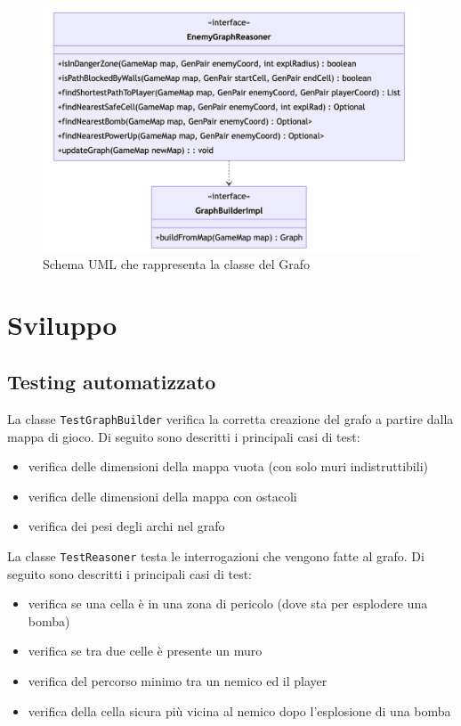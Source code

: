 \documentclass[a4paper,12pt]{report}
\begin{document}
\begin{figure}[h]
\centering{}
\includegraphics[width=\textwidth]{report-src/img/enemyGraph.png}
\caption{Schema UML che rappresenta la classe del Grafo}
\end{figure}

\chapter{Sviluppo}
\section{Testing automatizzato}

\par
La classe \texttt{TestGraphBuilder} verifica la corretta creazione del grafo a partire dalla mappa di gioco. Di seguito sono descritti i principali casi di test:
\begin{itemize}
    \item verifica delle dimensioni della mappa vuota (con solo muri indistruttibili)
    \item verifica delle dimensioni della mappa con ostacoli
    \item verifica dei pesi degli archi nel grafo
\end{itemize}

\par
La classe \texttt{TestReasoner} testa le interrogazioni che vengono fatte al grafo. Di seguito sono descritti i principali casi di test:
\begin{itemize}
    \item verifica se una cella è in una zona di pericolo (dove sta per esplodere una bomba)
    \item verifica se tra due celle è presente un muro
    \item verifica del percorso minimo tra un nemico ed il player
    \item verifica della cella sicura più vicina al nemico dopo l’esplosione di una bomba
\end{itemize}
\end{document}
